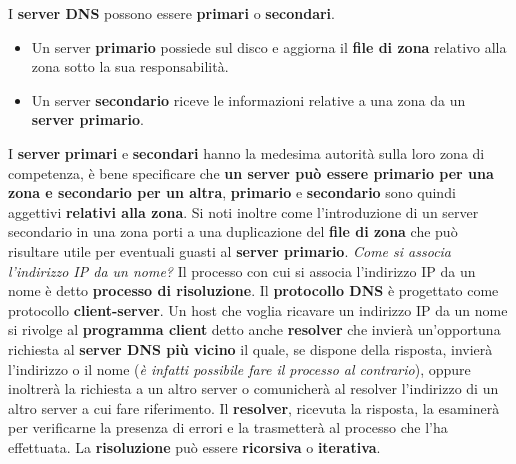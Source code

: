 \documentclass[11pt,a4paper]{article}
\theoremstyle{definition}
\begin{document}
I \textbf{server DNS} possono essere \textbf{primari} o \textbf{secondari}.
\begin{itemize}
	\item Un server \textbf{primario} possiede sul disco e aggiorna il \textbf{file di zona} relativo alla zona sotto la sua responsabilità.
	\item Un server \textbf{secondario} riceve le informazioni relative a una zona da un \textbf{server primario}.
\end{itemize}
I \textbf{server} \textbf{primari} e \textbf{secondari} hanno la medesima autorità sulla loro zona di competenza, è bene specificare che \textbf{un server può essere primario per una zona  e secondario per un altra}, \textbf{primario} e \textbf{secondario} sono quindi aggettivi \textbf{relativi alla zona}. Si noti inoltre come l'introduzione di un server secondario in una zona porti a una duplicazione del \textbf{file di zona} che può risultare utile per eventuali guasti al \textbf{server primario}.\newline\newline
\textit{Come si associa l'indirizzo IP da un nome?}\newline\newline
Il processo con cui si associa l'indirizzo IP da un nome è detto \textbf{processo di risoluzione}. Il \textbf{protocollo DNS} è progettato come protocollo \textbf{client-server}. Un host che voglia ricavare un indirizzo IP da un nome si rivolge al \textbf{programma client} detto anche \textbf{resolver} che invierà un'opportuna richiesta al \textbf{server DNS più vicino} il quale, se dispone della risposta, invierà l'indirizzo o il nome (\textit{è infatti possibile fare il processo al contrario}), oppure inoltrerà la richiesta a un altro server o comunicherà al resolver l'indirizzo di un altro server a cui fare riferimento. Il \textbf{resolver}, ricevuta la risposta, la esaminerà per verificarne la presenza di errori e la trasmetterà al processo che l'ha effettuata. La \textbf{risoluzione} può essere \textbf{ricorsiva} o \textbf{iterativa}.
\newpage
\end{document}
